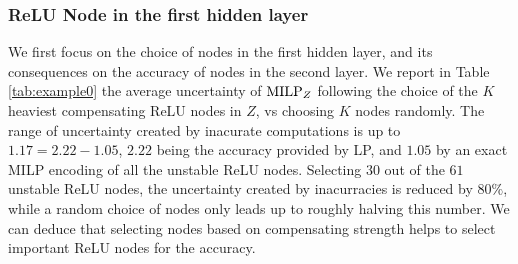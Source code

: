 
\iffalse

\subsubsection*{ReLU Node in the first hidden layer}


We first focus on the choice of nodes in the first hidden layer, and its consequences on the accuracy of nodes in the second layer. 
We report in Table \ref{tab:example0} the average uncertainty of ${\textrm{MILP}}_Z$ following the choice of the $K$ heaviest compensating ReLU nodes in $Z$, vs choosing $K$ nodes randomly. The range of uncertainty created by inacurate computations is up to $1.17=2.22-1.05$, $2.22$ being the accuracy provided by LP, and $1.05$ by an exact MILP encoding of all the unstable ReLU nodes. Selecting $30$ out of the $61$ unstable ReLU nodes, the uncertainty created by inacurracies is reduced by $80\%$, while a random choice of nodes only leads up to roughly halving this number. We can deduce that selecting nodes based on compensating strength helps to select important ReLU nodes for the accuracy.



